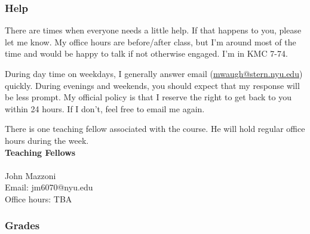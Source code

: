 \documentclass[12pt,pdftex,twoside,letterpaper]{exam}
\begin{document}
\subsubsection*{Help}

There are times when everyone needs a little help. If that happens to you, please let me know. My office hours are before/after class, but I'm around most of the time and would be happy to talk if not otherwise engaged. I'm in KMC 7-74.

During day time on weekdays, I generally answer email (\href{mailto:mwaugh@stern.nyu.edu}{mwaugh@stern.nyu.edu}) quickly. During evenings and weekends, you should expect that my response will be less prompt. My official policy is that I reserve the right to get back to you within 24 hours. If I don't, feel free to email me again.

There is one teaching fellow associated with the course. He will hold regular office hours during the week.\\

\textbf{Teaching Fellows}\\
\\
John Mazzoni \\
Email: jm6070@nyu.edu\\
Office hours: TBA\\

\newpage

\subsubsection*{Grades}
\end{document}
